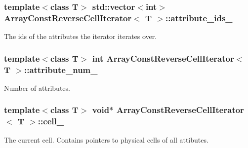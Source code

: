 \subsubsection[{attribute\+\_\+ids\+\_\+}]{\setlength{\rightskip}{0pt plus 5cm}template$<$class T$>$ std\+::vector$<$int$>$ {\bf Array\+Const\+Reverse\+Cell\+Iterator}$<$ T $>$\+::attribute\+\_\+ids\+\_\+\hspace{0.3cm}{\ttfamily [private]}}\label{classArrayConstReverseCellIterator_a19d149d56dc7278e5d8ea54d50ad453b}
The ids of the attributes the iterator iterates over. \hypertarget{classArrayConstReverseCellIterator_ac94910d5042e331562589963880bd05a}{}
\subsubsection[{attribute\+\_\+num\+\_\+}]{\setlength{\rightskip}{0pt plus 5cm}template$<$class T$>$ int {\bf Array\+Const\+Reverse\+Cell\+Iterator}$<$ T $>$\+::attribute\+\_\+num\+\_\+\hspace{0.3cm}{\ttfamily [private]}}\label{classArrayConstReverseCellIterator_ac94910d5042e331562589963880bd05a}
Number of attributes. \hypertarget{classArrayConstReverseCellIterator_a2376714f673c25eb19838da2d4fae9ac}{}
\subsubsection[{cell\+\_\+}]{\setlength{\rightskip}{0pt plus 5cm}template$<$class T$>$ void$\ast$ {\bf Array\+Const\+Reverse\+Cell\+Iterator}$<$ T $>$\+::cell\+\_\+\hspace{0.3cm}{\ttfamily [private]}}\label{classArrayConstReverseCellIterator_a2376714f673c25eb19838da2d4fae9ac}
The current cell. Contains pointers to physical cells of all attibutes. \hypertarget{classArrayConstReverseCellIterator_aadcf6aacd77397b27faf6405a4c4d406}{}
